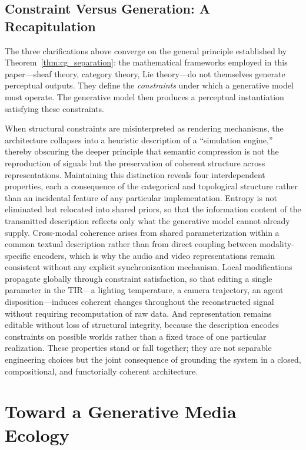 \documentclass[11pt,a4paper]{article}
\theoremstyle{definition}
\theoremstyle{remark}
\begin{document}
\subsection{Constraint Versus Generation: A Recapitulation}

The three clarifications above converge on the general principle established by Theorem~\ref{thm:cg_separation}: the mathematical frameworks employed in this paper---sheaf theory, category theory, Lie theory---do not themselves generate perceptual outputs. They define the \emph{constraints} under which a generative model must operate. The generative model then produces a perceptual instantiation satisfying these constraints.

When structural constraints are misinterpreted as rendering mechanisms, the architecture collapses into a heuristic description of a ``simulation engine,'' thereby obscuring the deeper principle that semantic compression is not the reproduction of signals but the preservation of coherent structure across representations. Maintaining this distinction reveals four interdependent properties, each a consequence of the categorical and topological structure rather than an incidental feature of any particular implementation. Entropy is not eliminated but relocated into shared priors, so that the information content of the transmitted description reflects only what the generative model cannot already supply. Cross-modal coherence arises from shared parameterization within a common textual description rather than from direct coupling between modality-specific encoders, which is why the audio and video representations remain consistent without any explicit synchronization mechanism. Local modifications propagate globally through constraint satisfaction, so that editing a single parameter in the TIR---a lighting temperature, a camera trajectory, an agent disposition---induces coherent changes throughout the reconstructed signal without requiring recomputation of raw data. And representation remains editable without loss of structural integrity, because the description encodes constraints on possible worlds rather than a fixed trace of one particular realization. These properties stand or fall together; they are not separable engineering choices but the joint consequence of grounding the system in a closed, compositional, and functorially coherent architecture.

\section{Toward a Generative Media Ecology}
\label{sec:ecology}
\end{document}
